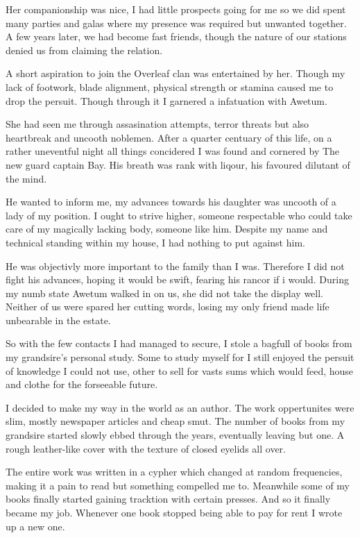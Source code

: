 \documentclass{article}
\begin{document}
Her companionship was nice, I had little prospects going for me so we did spent many parties and galas where my presence was required but unwanted together. A few years later, we had become fast friends, though the nature of our stations denied us from claiming the relation.

A short aspiration to join the Overleaf clan was entertained by her. Though my lack of footwork, blade alignment, physical strength or stamina caused me to drop the persuit. Though through it I garnered a infatuation with Awetum.

She had seen me through assasination attempts, terror threats but also heartbreak and uncooth noblemen. After a quarter centuary of this life, on a rather uneventful night all things concidered I was found and cornered by The new guard captain Bay. His breath was rank with liqour, his favoured dilutant of the mind.

He wanted to inform me, my advances towards his daughter was uncooth of a lady of my position. I ought to strive higher, someone respectable who could take care of my magically lacking body, someone like him. Despite my name and technical standing within my house, I had nothing to put against him. 

He was objectivly more important to the family than I was. Therefore I did not fight his advances, hoping it would be swift, fearing his rancor if i would. During my numb state Awetum walked in on us, she did not take the display well. Neither of us were spared her cutting words, losing my only friend made life unbearable in the estate.

So with the few contacts I had managed to secure, I stole a bagfull of books from my grandsire's personal study. Some to study myself for I still enjoyed the persuit of knowledge I could not use, other to sell for vasts sums which would feed, house and clothe for the forseeable future. 

I decided to make my way in the world as an author. The work oppertunites were slim, mostly newspaper articles and cheap smut. The number of books from my grandsire started slowly ebbed through the years, eventually leaving but one. A rough leather-like cover with the texture of closed eyelids all over. 

The entire work was written in a cypher which changed at random frequencies, making it a pain to read but something compelled me to. Meanwhile some of my books finally started gaining tracktion with certain presses. And so it finally became my job. Whenever one book stopped being able to pay for rent I wrote up a new one. 
\end{document}
